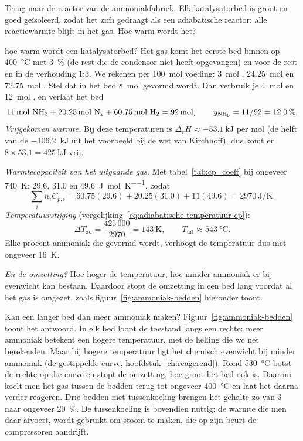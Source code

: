 Terug naar de reactor van de ammoniakfabriek. Elk katalysatorbed is groot en goed ge\"isoleerd, zodat het zich gedraagt als een adiabatische reactor: alle reactiewarmte blijft in het gas. Hoe warm wordt het?

\begin{casusuitgewerkt}{hoe warm wordt een katalysatorbed?}
Het gas komt het eerste bed binnen op \SI{400}{\celsius} met \SI{3}{\percent}  (de rest die de condensor niet heeft opgevangen) en voor de rest  en  in de verhouding 1:3. We rekenen per \SI{100}{\mole} voeding: \SI{3}{\mole} , \SI{24.25}{\mole}  en \SI{72.75}{\mole} . Stel dat in het bed \SI{8}{\mole}  gevormd wordt. Dan verbruik je \SI{4}{\mole}  en \SI{12}{\mole} , en verlaat het bed
\[
\SI{11}{\mole}\ \ce{NH3} + \SI{20.25}{\mole}\ \ce{N2} + \SI{60.75}{\mole}\ \ce{H2} = \SI{92}{\mole},
\qquad y_{\ce{NH3}} = 11/92 = \SI{12.0}{\percent}.
\]
\emph{Vrijgekomen warmte.} Bij deze temperaturen is $\Delta_r H \approx \SI{-53.1}{\kilo\joule}$ per mol  (de helft van de \SI{-106.2}{\kilo\joule} uit het voorbeeld bij de wet van Kirchhoff), dus komt er $8 \times 53.1 = \SI{425}{\kilo\joule}$ vrij.

\emph{Warmtecapaciteit van het uitgaande gas.} Met tabel~\ref{tab:cp_coeff} bij ongeveer \SI{740}{\kelvin}:  \SI{29.6}{},  \SI{31.0}{} en  \SI{49.6}{\joule\per\mole\per\kelvin}, zodat
\[
\sum_i n_i\overline{C}_{p,i} = 60.75(29.6) + 20.25(31.0) + 11(49.6) = \SI{2970}{\joule\per\kelvin}.
\]
\emph{Temperatuurstijging} (vergelijking~\eqref{eq:adiabatische-temperatuur-cp}):
\[
\Delta T_\mathrm{ad} = \frac{425\,000}{2970} = \SI{143}{\kelvin}, \qquad T_\text{uit} \approx \SI{543}{\celsius}.
\]
Elke procent ammoniak die gevormd wordt, verhoogt de temperatuur dus met ongeveer \SI{16}{\kelvin}.

\emph{En de omzetting?} Hoe hoger de temperatuur, hoe minder ammoniak er bij evenwicht kan bestaan. Daardoor stopt de omzetting in een bed lang voordat al het gas is omgezet, zoals figuur~\ref{fig:ammoniak-bedden} hieronder toont.
\end{casusuitgewerkt}

Kan een langer bed dan meer ammoniak maken? Figuur~\ref{fig:ammoniak-bedden} toont het antwoord. In elk bed loopt de toestand langs een rechte: meer ammoniak betekent een hogere temperatuur, met de helling die we net berekenden. Maar bij hogere temperatuur ligt het chemisch evenwicht bij minder ammoniak (de gestippelde curve, hoofdstuk~\ref{ch:reagerend}). Rond \SI{530}{\celsius} botst de rechte op die curve en stopt de omzetting, hoe groot het bed ook is. Daarom koelt men het gas tussen de bedden terug tot ongeveer \SI{400}{\celsius} en laat het daarna verder reageren. Drie bedden met tussenkoeling brengen het gehalte zo van \SI{3}{} naar ongeveer \SI{20}{\percent}. De tussenkoeling is bovendien nuttig: de warmte die men daar afvoert, wordt gebruikt om stoom te maken, die op zijn beurt de compressoren aandrijft.

